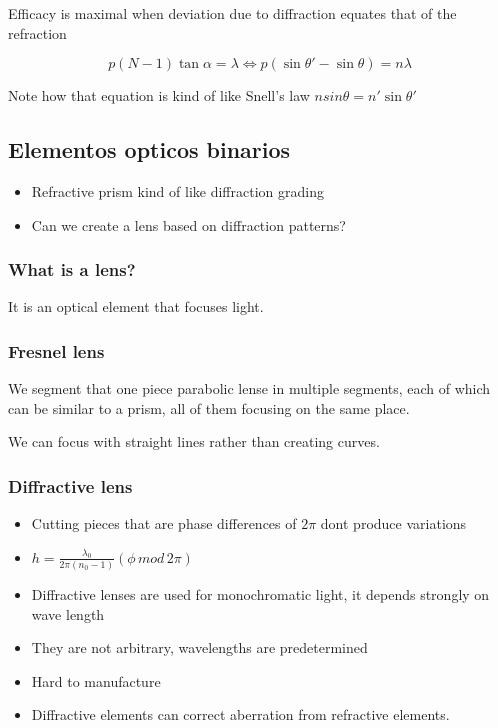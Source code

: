 \documentclass[../main/main.tex]{subfiles}
\begin{document}
 
Efficacy is maximal when deviation due to diffraction equates that of the refraction

\begin{equation}
p (N-1) \tan \alpha = \lambda \iff p (\sin \theta' -\sin \theta) = n \lambda
\end{equation}

Note how that equation is kind of like Snell's law $n sin \theta = n' \sin \theta ' $


\subsection{Elementos opticos binarios}

\begin{itemize}
	\item Refractive prism kind of like diffraction grading
	\item Can we create a lens based on diffraction patterns?
	
\end{itemize}

\subsubsection{What is a lens?}

It is an optical element that focuses light.

\subsubsection{Fresnel lens}

We segment that one piece parabolic lense in multiple segments, each of which can be similar to a prism, all of them focusing on the same place.

We can focus with straight lines rather than creating curves.

\subsubsection{Diffractive lens}

\begin{itemize}
	\item Cutting pieces that are phase differences of $2\pi$ dont produce variations
	\item $h = \frac{\lambda_{0}}{2\pi (n_{0} - 1)} (\phi\, mod \,2\pi)$
	\item Diffractive lenses are used for monochromatic light, it depends strongly on wave length
	\item They are not arbitrary, wavelengths are predetermined
	\item Hard to manufacture
	\item Diffractive elements can correct aberration from refractive elements.
	
\end{itemize}
\end{document}
